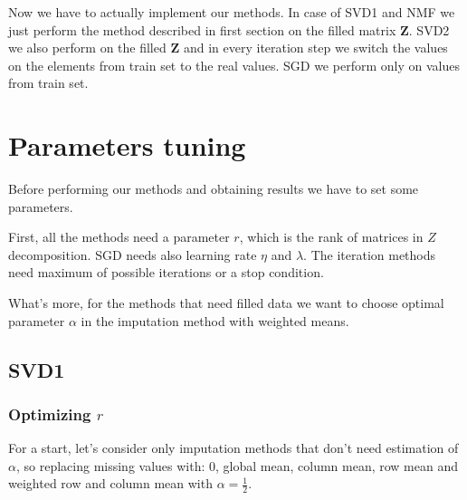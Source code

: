 \documentclass[10pt]{amsart}
\begin{document}
Now we have to actually implement our methods.
In case of SVD1 and NMF we just perform the method described in first section on the filled matrix $\boldsymbol{Z}$.
SVD2 we also perform on the filled $\boldsymbol{Z}$ and in every iteration step we switch the values on the elements from train set to the real values.
SGD we perform only on values from train set.




\section{Parameters tuning}

Before performing our methods and obtaining results we have to set some parameters.

First, all the methods need a parameter $r$, which is the rank of matrices in $Z$ decomposition.
SGD needs also learning rate $\eta$ and $\lambda$.
The iteration methods need maximum of possible iterations or a stop condition.

What's more, for the methods that need filled data we want to choose optimal parameter $\alpha$ in the imputation method with weighted means.



\subsection*{SVD1}
\subsubsection*{Optimizing $r$}
For a start, let's consider only imputation methods that don't need estimation of $\alpha$, so replacing missing values with: 0, global mean, column mean, row mean and weighted row and column mean with $\alpha = \frac{1}{2}$.
\end{document}
